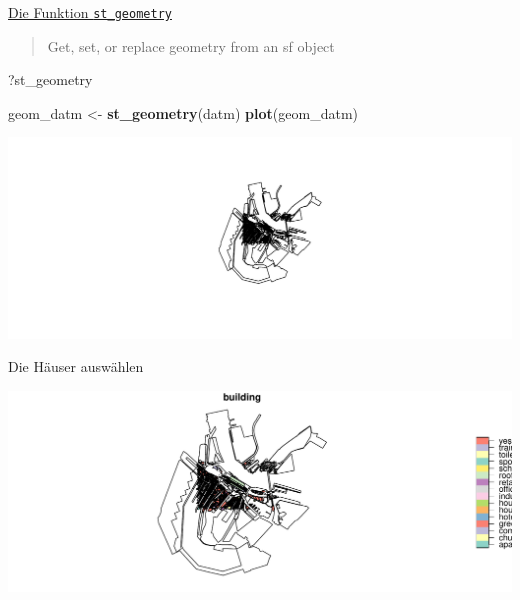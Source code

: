 \documentclass[ignorenonframetext,]{beamer}
\newenvironment{Shaded}{\begin{snugshade}}{\end{snugshade}}
\newcommand{\KeywordTok}[1]{\textcolor[rgb]{0.26,0.66,0.93}{\textbf{#1}}}
\newcommand{\NormalTok}[1]{\textcolor[rgb]{0.74,0.68,0.62}{#1}}
\newcommand{\OperatorTok}[1]{\textcolor[rgb]{0.74,0.68,0.62}{#1}}
\newcommand{\StringTok}[1]{\textcolor[rgb]{0.02,0.61,0.04}{#1}}
\begin{document}
\begin{frame}[fragile]{\href{https://cran.r-project.org/web/packages/sf/vignettes/sf3.html}{Die
Funktion \texttt{st\_geometry}}}
\protect\hypertarget{die-funktion-st_geometry}{}

\begin{quote}
Get, set, or replace geometry from an sf object
\end{quote}

\begin{Shaded}
\begin{Highlighting}[]
\NormalTok{?st_geometry}
\end{Highlighting}
\end{Shaded}

\begin{Shaded}
\begin{Highlighting}[]
\NormalTok{geom_datm <-}\StringTok{ }\KeywordTok{st_geometry}\NormalTok{(datm)}
\KeywordTok{plot}\NormalTok{(geom_datm)}
\end{Highlighting}
\end{Shaded}

\includegraphics{B7_simplefeatures_files/figure-beamer/unnamed-chunk-24-1.pdf}

\end{frame}

\begin{frame}[fragile]{Die Häuser auswählen}
\protect\hypertarget{die-hauser-auswahlen}{}

\begin{Shaded}
\end{Shaded}

\includegraphics{B7_simplefeatures_files/figure-beamer/unnamed-chunk-25-1.pdf}

\end{frame}
\end{document}
